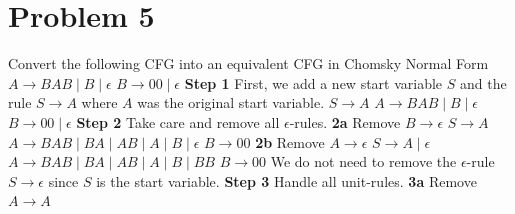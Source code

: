 \documentclass[11pt]{article}
\begin{document}
\newpage
\section*{Problem 5}

\noindent
Convert the following CFG into an equivalent CFG in Chomsky Normal Form
\newline
\newline
$A \rightarrow BAB \mid B \mid \epsilon$
\newline
$B \rightarrow 00 \mid \epsilon$
\newline
\newline
\noindent
\textbf{Step 1} First, we add a new start variable $S$ and the rule $S \rightarrow A$ where
$A$ was the original start variable.
\newline
\newline
$S \rightarrow A $
\newline
$A \rightarrow BAB \mid B \mid \epsilon$
\newline
$B \rightarrow 00 \mid \epsilon$
\newline
\newline
\noindent
\textbf{Step 2} Take care and remove all $\epsilon$-rules.
\newline
\newline
\textbf{2a} Remove $B \rightarrow \epsilon$
\newline
\newline
$S \rightarrow A $
\newline
$A \rightarrow BAB \mid BA \mid AB \mid A \mid B \mid \epsilon$
\newline
$B \rightarrow 00$
\newline
\newline
\textbf{2b} Remove $A \rightarrow \epsilon$
\newline
\newline
$S \rightarrow A \mid \epsilon$
\newline
$A \rightarrow BAB \mid BA \mid AB \mid A \mid B \mid BB$
\newline
$B \rightarrow 00$
\newline
\newline
\noindent
We do not need to remove the $\epsilon$-rule $S \rightarrow \epsilon$ since $S$ is the start variable.
\newpage
\noindent
\textbf{Step 3} Handle all unit-rules. 
\newline
\newline
\textbf{3a} Remove $A \rightarrow A$
\newline
\newline
\end{document}
